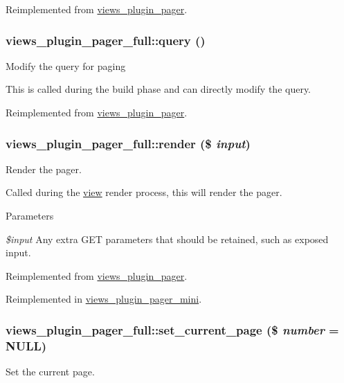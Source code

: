 Reimplemented from \hyperlink{classviews__plugin__pager_a5988e87c8ebcaed872cad117e9721515}{views\_\-plugin\_\-pager}.\hypertarget{classviews__plugin__pager__full_a97cf3d3a2a632da5a5efbea9b344b236}{
\subsubsection[{query}]{\setlength{\rightskip}{0pt plus 5cm}views\_\-plugin\_\-pager\_\-full::query ()}}
\label{classviews__plugin__pager__full_a97cf3d3a2a632da5a5efbea9b344b236}
Modify the query for paging

This is called during the build phase and can directly modify the query. 

Reimplemented from \hyperlink{classviews__plugin__pager_a6b9aad7e28125013cbf7a15c19e78d47}{views\_\-plugin\_\-pager}.\hypertarget{classviews__plugin__pager__full_a1832939d6ea8c80e643cb94bae96daf8}{
\subsubsection[{render}]{\setlength{\rightskip}{0pt plus 5cm}views\_\-plugin\_\-pager\_\-full::render (\$ {\em input})}}
\label{classviews__plugin__pager__full_a1832939d6ea8c80e643cb94bae96daf8}
Render the pager.

Called during the \hyperlink{classview}{view} render process, this will render the pager.


\begin{DoxyParams}{Parameters}
\item[{\em \$input}]Any extra GET parameters that should be retained, such as exposed input. \end{DoxyParams}


Reimplemented from \hyperlink{classviews__plugin__pager_abfc50728fdc63bfe94bcd242d39deb1e}{views\_\-plugin\_\-pager}.

Reimplemented in \hyperlink{classviews__plugin__pager__mini_a71a931670147e0b4356b3a0133104933}{views\_\-plugin\_\-pager\_\-mini}.\hypertarget{classviews__plugin__pager__full_a503e0a6ea9e4815d712d36b1911d61bb}{
\subsubsection[{set\_\-current\_\-page}]{\setlength{\rightskip}{0pt plus 5cm}views\_\-plugin\_\-pager\_\-full::set\_\-current\_\-page (\$ {\em number} = {\ttfamily NULL})}}
\label{classviews__plugin__pager__full_a503e0a6ea9e4815d712d36b1911d61bb}
Set the current page.


